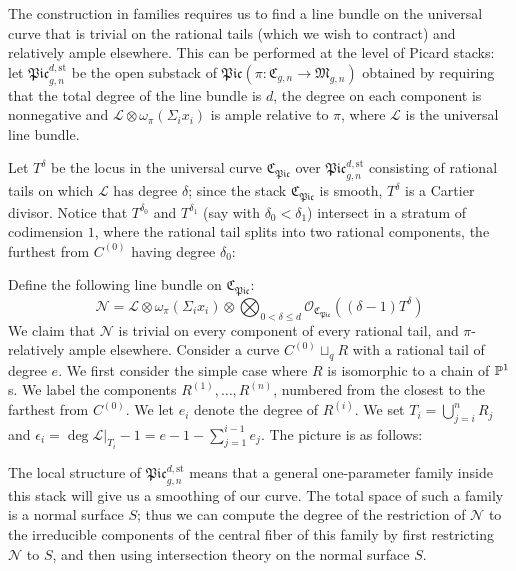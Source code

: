 The construction in families requires us to find a line bundle on the universal curve that is trivial on the rational tails (which we wish to contract) and relatively ample elsewhere. This can be performed at the level of Picard stacks: let $\mathfrak{Pic}_{g,n}^{d,\text{st}}$ be the open substack of $\mathfrak{Pic}(\pi\colon\mathfrak{C}_{g,n}\to\mathfrak{M}_{g,n})$ obtained by requiring that the total degree of the line bundle is $d$, the degree on each component is nonnegative and $\mathcal L\otimes\omega_{\pi}(\Sigma_i x_i)$ is ample relative to $\pi$, where $\mathcal L$ is the universal line bundle.

Let $T^{\delta}$ be the locus in the universal curve $\mathfrak{C}_{\mathfrak{Pic}}$ over $\mathfrak{Pic}_{g,n}^{d,\text{st}}$ consisting of rational tails on which $\mathcal L$ has degree $\delta$; since the stack $\mathfrak{C}_{\mathfrak{Pic}}$ is smooth, $T^{\delta}$ is a Cartier divisor. Notice that $T^{\delta_0}$ and $T^{\delta_1}$ (say with $\delta_0<\delta_1$) intersect in a stratum of codimension $1$, where the rational tail splits into two rational components, the furthest from $C^{(0)}$ having degree $\delta_0$:

\begin{center}

\end{center}
\medskip

Define the following line bundle on $\mathfrak{C}_{\mathfrak{Pic}}$:
\begin{equation*} \mathcal N=\mathcal L\otimes\omega_{\pi}(\Sigma_i x_i)\otimes\bigotimes_{0<\delta\leq d}\mathcal O_{\mathfrak{C}_{\mathfrak{Pic}}}((\delta-1) T^\delta) \end{equation*}
We claim that $\mathcal{N}$ is trivial on every component of every rational tail, and $\pi$-relatively ample elsewhere. Consider a curve $C^{(0)}\sqcup_q R$ with a rational tail of degree $e$. We first consider the simple case where $R$ is isomorphic to a chain of $\mathbb P^1$s. We label the components $R^{(1)},\ldots,R^{(n)}$, numbered from the closest to the farthest from $C^{(0)}$. We let $e_i$ denote the degree of $R^{(i)}$. We set $T_i=\bigcup_{j=i}^n R_j$ and $\epsilon_i=\deg \mathcal{L}|_{T_i} - 1 = e-1-\sum_{j=1}^{i-1} e_j$. The picture is as follows:

\begin{center}

\end{center}

The local structure of $\mathfrak{Pic}_{g,n}^{d,\text{st}}$ means that a general one-parameter family inside this stack will give us a smoothing of our curve. The total space of such a family is a normal surface $S$; thus we can compute the degree of the restriction of $\mathcal{N}$ to the irreducible components of the central fiber of this family by first restricting $\mathcal{N}$ to $S$, and then using intersection theory on the normal surface $S$.

